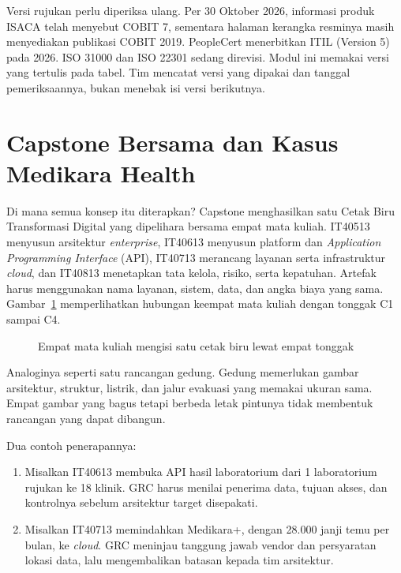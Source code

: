 Versi rujukan perlu diperiksa ulang. Per 30 Oktober 2026, informasi produk ISACA telah
menyebut COBIT 7, sementara halaman kerangka resminya masih menyediakan publikasi COBIT
2019. PeopleCert menerbitkan ITIL (Version 5) pada 2026. ISO 31000 dan ISO 22301 sedang
direvisi. Modul ini memakai versi yang tertulis pada tabel. Tim mencatat versi yang dipakai
dan tanggal pemeriksaannya, bukan menebak isi versi berikutnya.

\section{Capstone Bersama dan Kasus Medikara Health}

Di mana semua konsep itu diterapkan? Capstone menghasilkan satu Cetak Biru Transformasi
Digital yang dipelihara bersama empat
mata kuliah. IT40513 menyusun arsitektur \textit{enterprise}, IT40613 menyusun platform dan
\textit{Application Programming Interface} (API), IT40713 merancang layanan serta
infrastruktur \textit{cloud}, dan IT40813 menetapkan tata kelola, risiko, serta kepatuhan.
Artefak harus menggunakan nama layanan, sistem, data, dan angka biaya yang sama.
Gambar~\ref{fig:ch01-capstone} memperlihatkan hubungan keempat mata kuliah dengan tonggak C1
sampai C4.

\begin{figure}[!htb]
  \centering
  
  \caption{Empat mata kuliah mengisi satu cetak biru lewat empat tonggak}
  \label{fig:ch01-capstone}
\end{figure}

Analoginya seperti satu rancangan gedung. Gedung memerlukan gambar arsitektur, struktur,
listrik, dan jalur evakuasi yang memakai ukuran sama. Empat gambar yang bagus tetapi berbeda
letak pintunya tidak membentuk rancangan yang dapat dibangun.

Dua contoh penerapannya:
\begin{enumerate}
  \item Misalkan IT40613 membuka API hasil laboratorium dari 1 laboratorium rujukan ke 18
  klinik. GRC harus menilai penerima data, tujuan akses, dan kontrolnya sebelum arsitektur
  target disepakati.
  \item Misalkan IT40713 memindahkan Medikara+, dengan 28.000 janji temu per bulan, ke
  \textit{cloud}. GRC meninjau tanggung jawab vendor dan persyaratan lokasi data, lalu
  mengembalikan batasan kepada tim arsitektur.
\end{enumerate}

